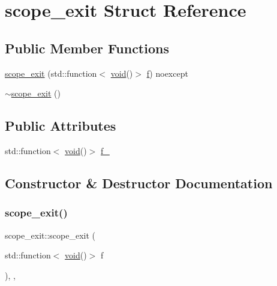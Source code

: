 \hypertarget{structscope__exit}{}\section{scope\+\_\+exit Struct Reference}
\label{structscope__exit}
\subsection*{Public Member Functions}
\begin{DoxyCompactItemize}
\item 
\mbox{\hyperlink{structscope__exit_a24378089e5cd4dcce2f76df0c9984b66}{scope\+\_\+exit}} (std\+::function$<$ \mbox{\hyperlink{_s_d_l__opengles2__gl2ext_8h_ae5d8fa23ad07c48bb609509eae494c95}{void}}()$>$ \mbox{\hyperlink{_s_d_l__opengl__glext_8h_a691492ec0bd6383f91200e49f6ae40ed}{f}}) noexcept
\item 
\mbox{\hyperlink{structscope__exit_a3aadbee6fe3862b5ce6f235ec2a7140d}{$\sim$scope\+\_\+exit}} ()
\end{DoxyCompactItemize}
\subsection*{Public Attributes}
\begin{DoxyCompactItemize}
\item 
std\+::function$<$ \mbox{\hyperlink{_s_d_l__opengles2__gl2ext_8h_ae5d8fa23ad07c48bb609509eae494c95}{void}}()$>$ \mbox{\hyperlink{structscope__exit_a87593924419e470d257f31b1c74d3f1e}{f\+\_\+}}
\end{DoxyCompactItemize}


\subsection{Constructor \& Destructor Documentation}
\mbox{\label{structscope__exit_a24378089e5cd4dcce2f76df0c9984b66}} 
\subsubsection{\texorpdfstring{scope\_exit()}{scope\_exit()}}
{\footnotesize\ttfamily scope\+\_\+exit\+::scope\+\_\+exit (\begin{DoxyParamCaption}\item[{std\+::function$<$ \mbox{\hyperlink{_s_d_l__opengles2__gl2ext_8h_ae5d8fa23ad07c48bb609509eae494c95}{void}}()$>$}]{f }\end{DoxyParamCaption})\hspace{0.3cm}{\ttfamily [inline]}, {\ttfamily [explicit]}, {\ttfamily [noexcept]}}

